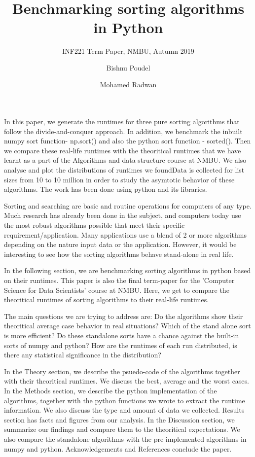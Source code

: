 \documentclass{acmart}
\title{Benchmarking sorting algorithms in Python}
\subtitle{INF221 Term Paper, NMBU, Autumn 2019}
\author{Bishnu Poudel}
\affiliation{}
\author{Mohamed Radwan}
\begin{document}
\maketitle




In this paper, we generate the runtimes for three pure sorting algorithms that follow the divide-and-conquer approach. In addition, we benchmark the inbuilt numpy sort function- np.sort() and also the python sort function - sorted(). 
Then we compare these real-life runtimes with the theoritical runtimes that we have learnt as a part of the Algorithms 
and data structure course at NMBU. We also analyse and plot the distributions of runtimes we foundData is collected for list sizes  from 10 to 10 million in order to study the asymtotic behavior of these algorithms.
The work has been done using python and its libraries.




Sorting and searching are basic and routine operations for computers of any type. Much research has already been done in the subject, and computers today use the most robust algorithms possible that meet their specific requirement/application. Many applications use a blend of 2 or more algorithms depending on the nature input data or the application.  However, it would be interesting to see how the  sorting algorithms behave stand-alone  in real life.

In the following section, we are benchmarking sorting algorithms in python based on their runtimes. This paper is also the final 
term-paper for the 'Computer Science for Data Scientists'  course at NMBU. Here, we get to compare the theoritical runtimes of sorting algorithms  to their real-life runtimes.

The main questions we are trying to address are: Do the algorithms show their theoritical average case behavior in real situations? 
Which of the stand alone sort is more efficient? Do these standalone sorts have a chance against the built-in sorts of numpy and python?
How are the runtimes of each run distributed, is there any statistical significance in the distribution?

In the Theory section, we describe the psuedo-code of the algorithms together with their theoritical runtimes. We discuss the best, average and the worst cases.  In the Methods section, we describe the python implementation of the algorithms, together with the python functions  we 
wrote to extract the runtime information. We also discuss the type and amount of data we collected. Results section has facts and figures from 
our analysis. In the Discussion section, we summarize our findings and compare them to the theoritical expectations. We also compare the 
standalone algorithms with the pre-implemented algorithms in numpy and python. Acknowledgements and References conclude the paper.
\end{document}
